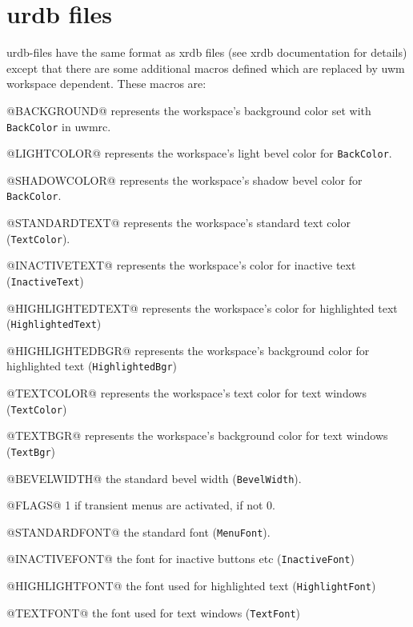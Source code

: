 \documentclass[10pt,a4paper]{article}
\newenvironment{ttdesc}[1]{
   \begin{list}{}{
          \renewcommand{\makelabel}[1]{\texttt{##1\hfill}}}}{\end{list}}
\begin{document}
\section{urdb files}
\label{urdb}
urdb-files have the same format as xrdb files (see xrdb documentation for details) except that there are some additional macros defined which are replaced by uwm workspace dependent. These macros are:
\begin{ttdesc}{description}
\item[@BACKGROUND@] represents the workspace's background color set with \texttt{BackColor} in uwmrc.
\item[@LIGHTCOLOR@] represents the workspace's light bevel color for \texttt{BackColor}.
\item[@SHADOWCOLOR@] represents the workspace's shadow bevel color for \texttt{BackColor}.
\item[@STANDARDTEXT@] represents the workspace's standard text color (\texttt{TextColor}).
\item[@INACTIVETEXT@] represents the workspace's color for inactive text (\texttt{InactiveText})
\item[@HIGHLIGHTEDTEXT@] represents the workspace's color for highlighted text (\texttt{HighlightedText})
\item[@HIGHLIGHTEDBGR@] represents the workspace's background color for highlighted text (\texttt{HighlightedBgr})
\item[@TEXTCOLOR@] represents the workspace's text color for text windows (\texttt{TextColor})
\item[@TEXTBGR@] represents the workspace's background color for text windows (\texttt{TextBgr})
\item[@BEVELWIDTH@] the standard bevel width (\texttt{BevelWidth}).
\item[@FLAGS@] 1 if transient menus are activated, if not 0.
\item[@STANDARDFONT@] the standard font (\texttt{MenuFont}).
\item[@INACTIVEFONT@] the font for inactive buttons etc (\texttt{InactiveFont})
\item[@HIGHLIGHTFONT@] the font used for highlighted text (\texttt{HighlightFont})
\item[@TEXTFONT@] the font used for text windows (\texttt{TextFont})
\end{ttdesc}
\end{document}
